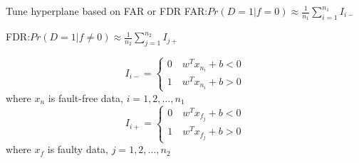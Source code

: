 \documentclass[10pt]{beamer}
\begin{document}
\begin{frame}{Tune hyperplane based on FAR or FDR}
FAR:$Pr(D=1|f=0) \approx \frac{1}{n_1}\sum_{i=1}^{n_1}I_{i-}$  \par
FDR:$Pr(D=1|f \neq 0) \approx          \frac{1}{n_2}\sum_{j=1}^{n_2}I_{j+}$ \par
\begin{equation}
I_{i-} = \left\{ \begin{aligned}
0 \quad  w^Tx_{n_i} + b < 0 \\
1 \quad w^Tx_{n_i} +b  > 0 
\end{aligned}
\right.
\end{equation}
where $x_n$ is fault-free data, $i=1,2,\dots,n_1$
\begin{equation}
I_{i+} = \left\{ \begin{aligned}
0 \quad  w^Tx_{f_j} + b < 0 \\
1 \quad w^Tx_{f_j} +b  > 0 
\end{aligned}
\right.
\end{equation}
where $x_f$ is faulty data, $j=1,2,\dots,n_2$
\end{frame}
\end{document}
